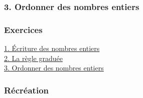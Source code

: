 \documentclass[8pt]{beamer}
\newcommand{\cheminatome}{../atomes}
\begin{document}
\begin{frame}
\frametitle{3. Ordonner des nombres entiers\hypertarget{section3}{ } \hspace{0pt plus 1 filll} \hyperlink{cours}{\beamerbutton{\faReply}} \hyperlinkslideprev{{\Huge \faAngleLeft}} \hyperlink{menu}{\beamerbutton{\faHome}} \hyperlinkslidenext{{\Huge \faAngleRight}}}

\end{frame}

\begin{frame}
\frametitle{ \hspace{0pt plus 1 filll} \hyperlink{cours}{\beamerbutton{\faReply}} \hyperlinkslideprev{{\Huge \faAngleLeft}} \hyperlink{menu}{\beamerbutton{\faHome}} \hyperlinkslidenext{{\Huge \faAngleRight}}}

\end{frame}

\begin{frame}
\frametitle{ \hspace{0pt plus 1 filll} \hyperlink{cours}{\beamerbutton{\faReply}} \hyperlinkslideprev{{\Huge \faAngleLeft}} \hyperlink{menu}{\beamerbutton{\faHome}} {\Huge \textcolor{blue!10!white}{\faAngleRight}}}

\end{frame}

\begin{frame}
\frametitle{\hypertarget{exercices}{\textbf{Exercices}} \hspace{0pt plus 1 filll} \hyperlink{menu}{\beamerbutton{\faHome}}}
\begin{Large}
\hyperlink{section1exo}{1. Écriture des nombres entiers} \\
\vspace{5mm}
\hyperlink{section2exo}{2. La règle graduée} \\
\vspace{5mm}
\hyperlink{section3exo}{3. Ordonner des nombres entiers}
\end{Large}
\end{frame}

% 

\begin{frame}[t]
\frametitle{\hypertarget{recreation}{\textbf{Récréation}} \hspace{0pt plus 1 filll} \hyperlink{menu}{\beamerbutton{\faHome}}}
\end{frame}
\end{document}
